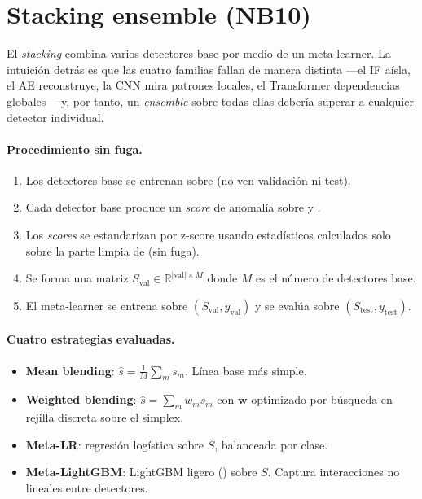 \section{Stacking ensemble (NB10)}
\label{sec:nb10}

El \textit{stacking} combina varios detectores base por medio de un meta-learner. La intuición detrás es que las cuatro familias fallan de manera distinta ---el IF aísla, el AE reconstruye, la CNN mira patrones locales, el Transformer dependencias globales--- y, por tanto, un \textit{ensemble} sobre todas ellas debería superar a cualquier detector individual.

\paragraph{Procedimiento sin fuga.}
\begin{enumerate}[label=\textbf{\arabic*.},leftmargin=*,topsep=0pt]
  \item Los detectores base se entrenan sobre  (no ven validación ni test).
  \item Cada detector base produce un \emph{score} de anomalía sobre  y .
  \item Los \emph{scores} se estandarizan por z-score usando estadísticos calculados solo sobre la parte limpia de  (sin fuga).
  \item Se forma una matriz $S_{\mathrm{val}} \in \mathbb{R}^{|\mathrm{val}| \times M}$ donde $M$ es el número de detectores base.
  \item El meta-learner se entrena sobre $(S_{\mathrm{val}}, y_{\mathrm{val}})$ y se evalúa sobre $(S_{\mathrm{test}}, y_{\mathrm{test}})$.
\end{enumerate}

\paragraph{Cuatro estrategias evaluadas.}
\begin{itemize}[leftmargin=*,topsep=0pt]
  \item \textbf{Mean blending}: $\hat s = \frac{1}{M}\sum_m s_m$. Línea base más simple.
  \item \textbf{Weighted blending}: $\hat s = \sum_m w_m s_m$ con $\bm{w}$ optimizado por búsqueda en rejilla discreta sobre el simplex.
  \item \textbf{Meta-LR}: regresión logística sobre $S$, balanceada por clase.
  \item \textbf{Meta-LightGBM}: LightGBM ligero () sobre $S$. Captura interacciones no lineales entre detectores.
\end{itemize}

